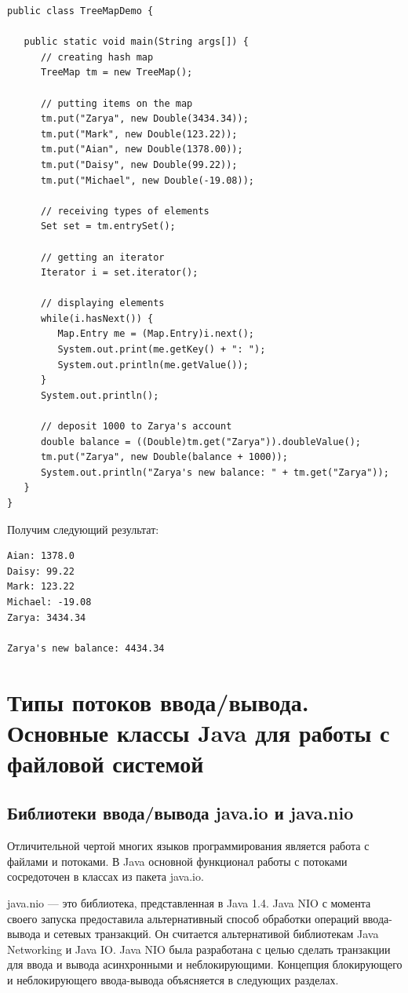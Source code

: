 \begin{lstlisting}
public class TreeMapDemo {

   public static void main(String args[]) {
      // creating hash map
      TreeMap tm = new TreeMap();
      
      // putting items on the map
      tm.put("Zarya", new Double(3434.34));
      tm.put("Mark", new Double(123.22));
      tm.put("Aian", new Double(1378.00));
      tm.put("Daisy", new Double(99.22));
      tm.put("Michael", new Double(-19.08));
      
      // receiving types of elements
      Set set = tm.entrySet();
      
      // getting an iterator
      Iterator i = set.iterator();
      
      // displaying elements
      while(i.hasNext()) {
         Map.Entry me = (Map.Entry)i.next();
         System.out.print(me.getKey() + ": ");
         System.out.println(me.getValue());
      }
      System.out.println();
      
      // deposit 1000 to Zarya's account
      double balance = ((Double)tm.get("Zarya")).doubleValue();
      tm.put("Zarya", new Double(balance + 1000));
      System.out.println("Zarya's new balance: " + tm.get("Zarya"));
   }
}
\end{lstlisting}

Получим следующий результат:

\begin{lstlisting}
Aian: 1378.0
Daisy: 99.22
Mark: 123.22
Michael: -19.08
Zarya: 3434.34

Zarya's new balance: 4434.34
\end{lstlisting}

\chapter{Типы потоков ввода/вывода. Основные классы Java для работы с файловой системой}
\section{Библиотеки ввода/вывода java.io и java.nio}

Отличительной чертой многих языков программирования является работа с файлами и потоками. В Java основной функционал работы с потоками сосредоточен в классах из пакета java.io. 

java.nio — это библиотека, представленная в Java 1.4. Java NIO с момента своего запуска предоставила альтернативный способ обработки операций ввода-вывода и сетевых транзакций. Он считается альтернативой библиотекам Java Networking и Java IO. Java NIO была разработана с целью сделать транзакции для ввода и вывода асинхронными и неблокирующими. Концепция блокирующего и неблокирующего ввода-вывода объясняется в следующих разделах.

